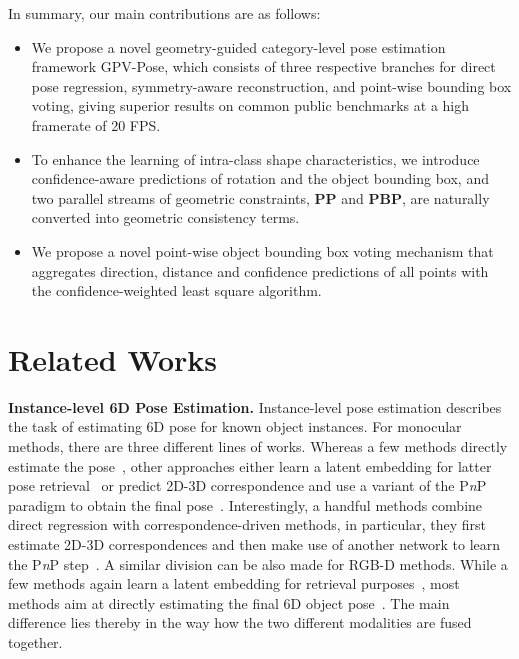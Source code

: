 \documentclass[10pt,twocolumn,letterpaper]{article}
\begin{document}
In summary, our main contributions are as follows:
\begin{itemize}
\setlength{\itemsep}{0pt}
\setlength{\parsep}{0pt}
\setlength{\parskip}{0pt}
\item 
We propose a novel geometry-guided category-level pose estimation framework GPV-Pose, which consists of three respective branches for direct pose regression, symmetry-aware reconstruction, and point-wise bounding box voting, giving superior results on common public benchmarks at a high framerate of 20 FPS.
\item 
To enhance the learning of intra-class shape characteristics, we introduce confidence-aware predictions of rotation and the object bounding box, and two parallel streams of geometric constraints, \textbf{PP} and \textbf{PBP}, are naturally converted into geometric consistency terms.
\item 
We propose a novel point-wise object bounding box voting mechanism that aggregates direction, distance and confidence predictions of all points with the confidence-weighted least square algorithm.
\end{itemize} \section{Related Works}
\textbf{Instance-level 6D Pose Estimation.}
Instance-level pose estimation describes the task of estimating 6D pose for known object instances. 
For monocular methods, there are three different lines of works. 
Whereas a few methods directly estimate the pose~\cite{Kehl2017, xiang2017posecnn, manhardt2018deep, manhardt2019explaining, li2019deepim, labbe2020cosypose}, other approaches either learn a latent embedding for latter pose retrieval~\cite{Sundermeyer_2018_ECCV,sundermeyer2020multi} or predict 2D-3D correspondence and use a variant of the P\textit{n}P paradigm to obtain the final pose~\cite{li2019cdpn,hybridpose,peng2019pvnet,zakharov2019dpod,hodan2020epos,park2019pix2pose}. 
Interestingly, a handful methods combine direct regression with correspondence-driven methods, in particular, they first estimate 2D-3D correspondences and then make use of another network to learn the P\textit{n}P step~\cite{hu2020single, sopose, GDRN}.
A similar division can be also made for RGB-D methods. While a few methods again learn a latent embedding for retrieval purposes~\cite{wohlhart2015learning, Kehl2016a}, most methods aim at directly estimating the final 6D object pose~\cite{6drgbd, wang2019densefusion, he2020pvn3d, FFB6D}. The main difference lies thereby in the way how the two different modalities are fused together. 
\end{document}
